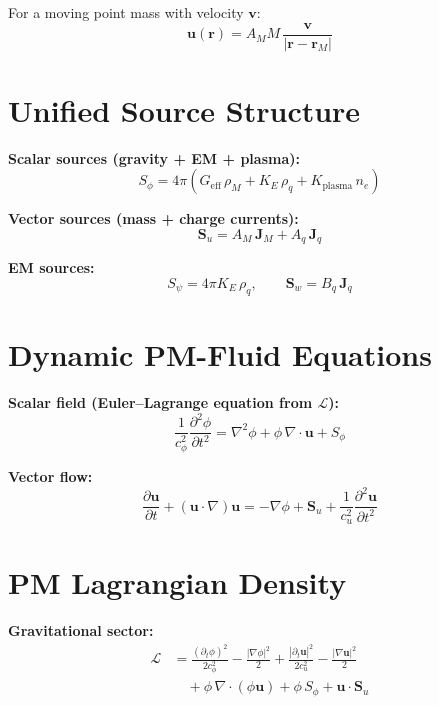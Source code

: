\documentclass[10pt,twocolumn]{article}
\begin{document}
For a moving point mass with velocity $\mathbf v$:
\[
  \mathbf u(\mathbf r) = A_M M\,\frac{\mathbf v}{|\mathbf r - \mathbf r_M|}
\]

\section{Unified Source Structure}

\textbf{Scalar sources (gravity + EM + plasma):}
\[
  S_\phi = 4\pi\!\left(G_{\mathrm{eff}}\,\rho_M + K_E\,\rho_q + K_{\mathrm{plasma}}\,n_e\right)
\]

\textbf{Vector sources (mass + charge currents):}
\[
  \mathbf S_u = A_M\,\mathbf J_M + A_q\,\mathbf J_q
\]

\textbf{EM sources:}
\[
  S_\psi = 4\pi K_E\,\rho_q, \qquad
  \mathbf S_w = B_q\,\mathbf J_q
\]

\section{Dynamic PM-Fluid Equations}

\textbf{Scalar field (Euler--Lagrange equation from $\mathcal{L}$):}
\[
  \frac{1}{c_\phi^2}\frac{\partial^2\phi}{\partial t^2}
  = \nabla^2\phi + \phi\,\nabla\cdot\mathbf{u} + S_\phi
\]

\textbf{Vector flow:}
\[
  \frac{\partial\mathbf u}{\partial t} + (\mathbf u\cdot\nabla)\mathbf u
  = -\nabla\phi + \mathbf S_u + \frac{1}{c_u^2}\frac{\partial^2\mathbf u}{\partial t^2}
\]

\section{PM Lagrangian Density}

\textbf{Gravitational sector:}
\begin{align*}
  \mathcal{L} &=
  \frac{(\partial_t\phi)^2}{2c_\phi^2}
  - \frac{|\nabla\phi|^2}{2}
  + \frac{|\partial_t\mathbf u|^2}{2c_u^2}
  - \frac{|\nabla\mathbf u|^2}{2} \\
  &\quad+ \phi\,\nabla\cdot(\phi\mathbf u)
  + \phi\,S_\phi + \mathbf u\cdot\mathbf S_u
\end{align*}
\end{document}
